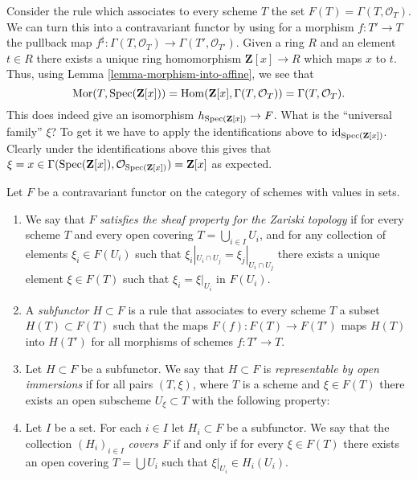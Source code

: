 \begin{example}
\label{example-global-sections}
Consider the rule which associates to every scheme $T$ the set
$F(T) = \Gamma(T, \mathcal{O}_T)$. We can turn this into a contravariant
functor by using for a morphism $f : T' \to T$ the pullback map
$f^\sharp : \Gamma(T, \mathcal{O}_T) \to \Gamma(T', \mathcal{O}_{T'})$.
Given a ring $R$ and an element $t \in R$ there exists a unique
ring homomorphism $\mathbf{Z}[x] \to R$ which maps $x$ to $t$.
Thus, using Lemma \ref{lemma-morphism-into-affine}, we see that
$$
\mathop{\rm Mor}\nolimits(T, \mathop{\rm Spec}(\mathbf{Z}[x])) =
\mathop{\rm Hom}\nolimits(\mathbf{Z}[x], \Gamma(T, \mathcal{O}_T)) =
\Gamma(T, \mathcal{O}_T).
$$
This does indeed
give an isomorphism $h_{\mathop{\rm Spec}(\mathbf{Z}[x])} \to F$.
What is the ``universal family'' $\xi$? To get it we have to
apply the identifications above to $\text{id}_{\mathop{\rm Spec}(\mathbf{Z}[x])}$.
Clearly under the identifications above this gives
that
$\xi = x \in \Gamma(\mathop{\rm Spec}(\mathbf{Z}[x]),
\mathcal{O}_{\mathop{\rm Spec}(\mathbf{Z}[x])}) = \mathbf{Z}[x]$
as expected.
\end{example}

\begin{definition}
\label{definition-representable-by-open-immersions}
Let $F$ be a contravariant functor on the category
of schemes with values in sets.
\begin{enumerate}
\item We say that $F$ {\it satisfies the sheaf property for the
Zariski topology} if for every scheme $T$ and every open covering
$T = \bigcup_{i \in I} U_i$, and for any collection of elements
$\xi_i \in F(U_i)$ such that $\xi_i|_{U_i \cap U_j} =
\xi_j|_{U_i \cap U_j}$ there exists a unique element
$\xi \in F(T)$ such that $\xi_i = \xi|_{U_i}$ in $F(U_i)$.
\item A {\it subfunctor $H \subset F$} is a rule that associates
to every scheme $T$ a subset $H(T) \subset F(T)$ such that
the maps $F(f) : F(T) \to F(T')$ maps $H(T)$ into
$H(T')$ for all morphisms of schemes $f : T' \to T$.
\item Let $H \subset F$ be a subfunctor. We say that
$H \subset F$ is {\it representable by open immersions}
if for all pairs $(T, \xi)$, where $T$ is a scheme and $\xi \in F(T)$
there exists an open subscheme $U_\xi \subset T$ with the following
property:
\item Let $I$ be a set. For each $i \in I$ let $H_i \subset F$
be a subfunctor. We say that the collection $(H_i)_{i \in I}$
{\it covers $F$} if and only if for every $\xi \in F(T)$
there exists an open covering $T = \bigcup U_i$ such that
$\xi|_{U_i} \in H_i(U_i)$.
\end{enumerate}
\end{definition}

